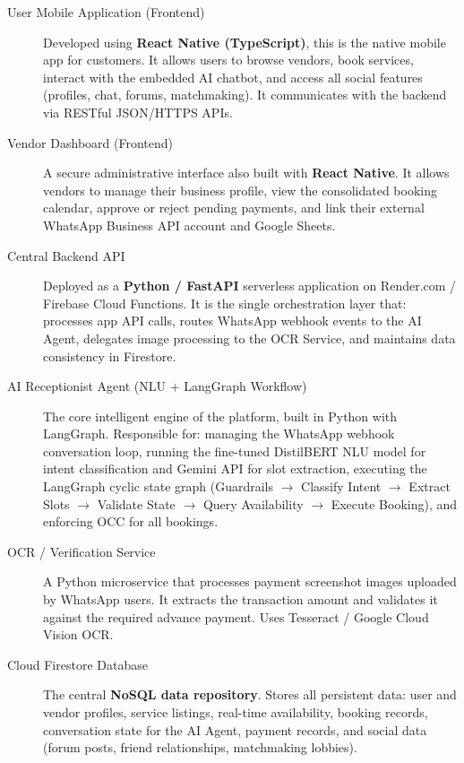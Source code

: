 \begin{description}
  \item[User Mobile Application (Frontend)]
        Developed using \textbf{React Native (TypeScript)}, this is the native mobile
        app for customers.  It allows users to browse vendors, book services, interact
        with the embedded AI chatbot, and access all social features (profiles, chat,
        forums, matchmaking).  It communicates with the backend via RESTful JSON/HTTPS
        APIs.

  \item[Vendor Dashboard (Frontend)]
        A secure administrative interface also built with \textbf{React Native}.  It
        allows vendors to manage their business profile, view the consolidated booking
        calendar, approve or reject pending payments, and link their external WhatsApp
        Business API account and Google Sheets.

  \item[Central Backend API]
        Deployed as a \textbf{Python / FastAPI} serverless application on
        Render.com / Firebase Cloud Functions.  It is the single orchestration layer
        that: processes app API calls, routes WhatsApp webhook events to the AI Agent,
        delegates image processing to the OCR Service, and maintains data consistency
        in Firestore.

  \item[AI Receptionist Agent (NLU + LangGraph Workflow)]
        The core intelligent engine of the platform, built in Python with LangGraph.
        Responsible for: managing the WhatsApp webhook conversation loop, running the
        fine-tuned DistilBERT NLU model for intent classification and Gemini API for
        slot extraction, executing the LangGraph cyclic state graph (Guardrails
        $\to$ Classify Intent $\to$ Extract Slots $\to$ Validate State $\to$ Query
        Availability $\to$ Execute Booking), and enforcing OCC for all bookings.

  \item[OCR / Verification Service]
        A Python microservice that processes payment screenshot images uploaded by
        WhatsApp users.  It extracts the transaction amount and validates it against
        the required advance payment.  Uses Tesseract / Google Cloud Vision OCR.

  \item[Cloud Firestore Database]
        The central \textbf{NoSQL data repository}.  Stores all persistent data: user
        and vendor profiles, service listings, real-time availability, booking records,
        conversation state for the AI Agent, payment records, and social data (forum
        posts, friend relationships, matchmaking lobbies).


\end{description}
